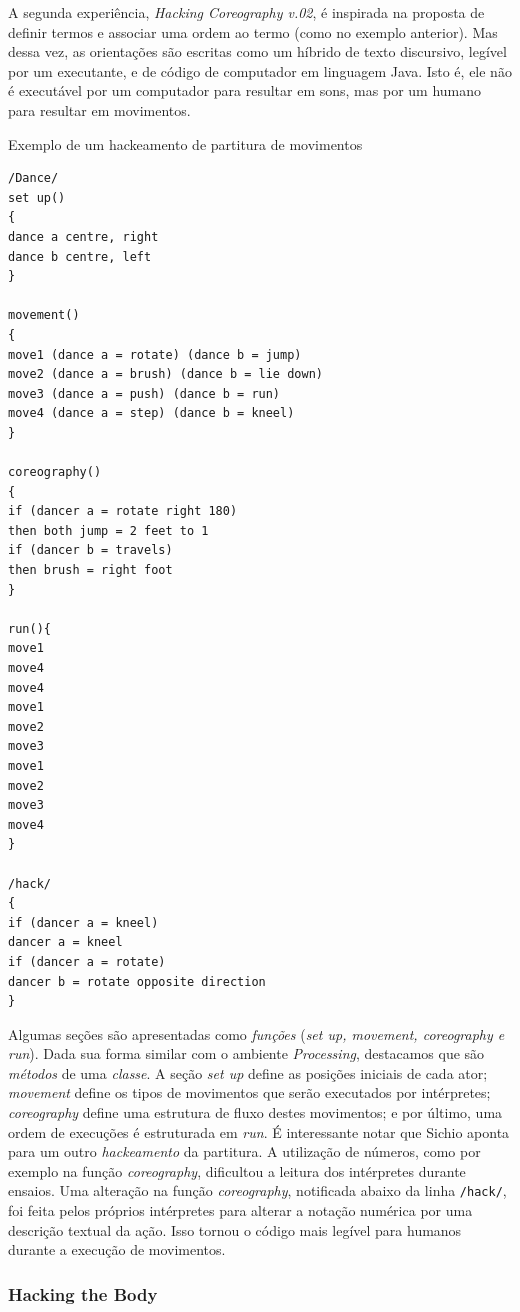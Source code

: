 A segunda experiência, \emph{Hacking Coreography v.02}, é inspirada na proposta de definir termos e associar uma ordem ao termo (como no exemplo anterior). Mas dessa vez, as orientações são escritas como um híbrido de texto discursivo, legível por um executante, e de código de computador em linguagem Java. Isto é, ele não é executável por um computador para resultar em sons, mas por um humano para resultar em movimentos.

\begin{example}{Exemplo de um hackeamento de partitura de movimentos}
\begin{verbatim}
/Dance/
set up()
{
dance a centre, right
dance b centre, left
}

movement()
{
move1 (dance a = rotate) (dance b = jump)
move2 (dance a = brush) (dance b = lie down)
move3 (dance a = push) (dance b = run)
move4 (dance a = step) (dance b = kneel)
}

coreography()
{
if (dancer a = rotate right 180)
then both jump = 2 feet to 1
if (dancer b = travels)
then brush = right foot
}

run(){
move1
move4
move4
move1
move2
move3
move1
move2
move3
move4
}

/hack/
{
if (dancer a = kneel)
dancer a = kneel
if (dancer a = rotate)
dancer b = rotate opposite direction 
}
\end{verbatim}
\end{example}

Algumas seções são apresentadas como \emph{funções} (\emph{set up, movement, coreography \emph{e} run}). Dada sua forma similar com o ambiente \emph{Processing}, destacamos que são \emph{métodos} de uma \emph{classe}. A seção \emph{set up} define as posições iniciais de cada ator; \emph{movement} define os tipos de movimentos que serão executados por intérpretes; \emph{coreography} define uma estrutura de fluxo destes movimentos; e por último, uma ordem de execuções é estruturada em \emph{run}. É interessante notar que Sichio aponta para um outro \emph{hackeamento} da partitura. A utilização de números, como por exemplo na função \emph{coreography}, dificultou a leitura dos intérpretes durante ensaios. Uma alteração na função \emph{coreography}, notificada abaixo da linha \verb|/hack/|, foi feita pelos próprios intérpretes para alterar a notação numérica por uma descrição textual da ação. Isso tornou o código mais legível para humanos durante a execução de movimentos. 

\subsubsection{Hacking the Body}

